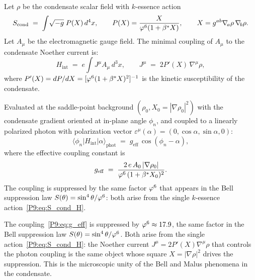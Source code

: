 \begin{theorem}
\label{P9:thm:H_int}
Let $\rho$ be the condensate scalar field with $k$-essence action
\begin{equation}
  S_\mathrm{cond}
  \;=\; \int\!\sqrt{-g}\;P(X)\,d^4x,
  \qquad
  P(X) = \frac{X}{\varphi^6(1+\beta^{*} X)},
  \qquad
  X = g^{ab}\nabla_{\!a}\rho\,\nabla_{\!b}\rho.
  \label{P9:eq:S_cond_H}
\end{equation}
Let $A_\mu$ be the electromagnetic gauge field.
The minimal coupling of $A_\mu$ to the condensate Noether current is:
\begin{equation}
  H_\mathrm{int}
  \;=\; e\int J^\mu A_\mu\,d^3x,
  \qquad
  J^\mu \;=\; 2P'(X)\,\nabla^\mu\rho,
  \label{P9:eq:H_int}
\end{equation}
where $P'(X) = dP/dX = [\varphi^6(1+\beta^{*} X)^2]^{-1}$ is the kinetic
susceptibility of the condensate.

Evaluated at the saddle-point background $(\rho_0, X_0=|\nabla\rho_0|^2)$
with the condensate gradient oriented at in-plane angle $\phi_n$, and
coupled to a linearly polarized photon with polarization vector
$\varepsilon^\mu(\alpha) = (0,\cos\alpha,\sin\alpha,0)$:
\begin{equation}
  \langle\phi_n|H_\mathrm{int}|\alpha\rangle_\mathrm{phot}
  \;=\; g_\mathrm{eff}\,\cos(\phi_n - \alpha),
  \label{P9:eq:H_int_matrix}
\end{equation}
where the effective coupling constant is
\begin{equation}
  g_\mathrm{eff}
  \;=\; \frac{2\,e\,A_0\,|\nabla\rho_0|}{\varphi^6\,(1+\beta^{*} X_0)^2}.
  \label{P9:eq:g_eff}
\end{equation}
The coupling is suppressed by the same factor $\varphi^6$ that appears in the
Bell suppression law $S(\theta)=\sin^4\theta/\varphi^6$:
both arise from the single $k$-essence action~\eqref{P9:eq:S_cond_H}.
\end{theorem}

\begin{remark}
\label{P9:rem:phi6_connection}
The coupling~\eqref{P9:eq:g_eff} is suppressed by $\varphi^6\approx17.9$,
the same factor in the Bell suppression law $S(\theta)=\sin^4\theta/\varphi^6$.
Both arise from the single action~\eqref{P9:eq:S_cond_H}: the Noether current
$J^\mu=2P'(X)\nabla^\mu\rho$ that controls the photon coupling is the same
object whose square $X=|\nabla\rho|^2$ drives the suppression.
This is the microscopic unity of the Bell and Malus phenomena in the condensate.
\end{remark}

